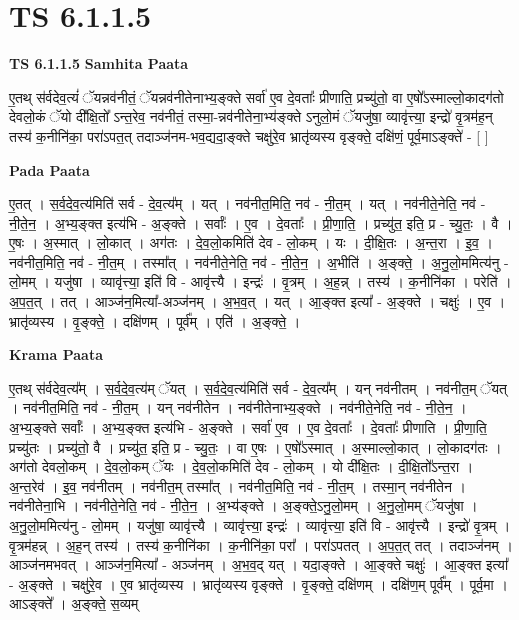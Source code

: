 \documentclass[17pt]{extarticle}
\begin{document}
\section{ TS 6.1.1.5 }

\textbf{TS 6.1.1.5 } \newline
\textbf{Samhita Paata} \newline

ए॒तथ् स॑र्वदेव॒त्यं॑ ॅयन्नव॑नीतं॒ ॅयन्नव॑नीतेनाभ्य॒ङ्क्ते सर्वा॑ ए॒व दे॒वताः᳚ प्रीणाति॒ प्रच्यु॑तो॒ वा ए॒षो᳚ऽस्माल्लो॒कादग॑तो देवलो॒कं ॅयो दी᳚क्षि॒तो᳚ ऽन्त॒रेव॒ नव॑नीतं॒ तस्मा॒-न्नव॑नीतेना॒भ्य॑ङ्क्ते ऽनुलो॒मं ॅयजु॑षा॒ व्यावृ॑त्त्या॒ इन्द्रो॑ वृ॒त्रम॑ह॒न् तस्य॑ क॒नीनि॑का॒ परा॑ऽपत॒त् तदाञ्ज॑नम-भव॒द्यदा॒ङ्क्ते चक्षु॑रे॒व भ्रातृ॑व्यस्य वृङ्क्ते॒ दक्षि॑णं॒ पूर्व॒माऽङ्क्ते॑ - [  ] \newline

\textbf{Pada Paata} \newline

ए॒तत् । स॒र्व॒दे॒व॒त्य॑मिति॑ सर्व - दे॒व॒त्य᳚म् । यत् । नव॑नीत॒मिति॒ नव॑ - नी॒त॒म् । यत् । नव॑नीते॒नेति॒ नव॑ - नी॒ते॒न॒ । अ॒भ्य॒ङ्क्त इत्य॑भि - अ॒ङ्क्ते । सर्वाः᳚ । ए॒व । दे॒वताः᳚ । प्री॒णा॒ति॒ । प्रच्यु॑त॒ इति॒ प्र - च्यु॒तः॒ । वै । ए॒षः । अ॒स्मात् । लो॒कात् । अग॑तः । दे॒व॒लो॒कमिति॑ देव - लो॒कम् । यः । दी॒क्षि॒तः । अ॒न्त॒रा । इ॒व॒ । नव॑नीत॒मिति॒ नव॑ - नी॒त॒म् । तस्मा᳚त् । नव॑नीते॒नेति॒ नव॑ - नी॒ते॒न॒ । अ॒भीति॑ । अ॒ङ्क्ते॒ । अ॒नु॒लो॒ममित्य॑नु - लो॒मम् । यजु॑षा । व्यावृ॑त्त्या॒ इति॑ वि - आवृ॑त्त्यै । इन्द्रः॑ । वृ॒त्रम् । अ॒ह॒न्न् । तस्य॑ । क॒नीनि॑का । परेति॑ । अ॒प॒त॒त् । तत् । आञ्ज॑न॒मित्या᳚-अञ्ज॑नम् । अ॒भ॒व॒त् । यत् । आ॒ङ्क्त इत्या᳚ - अ॒ङ्क्ते । चक्षुः॑ । ए॒व । भ्रातृ॑व्यस्य । वृ॒ङ्क्ते॒ । दक्षि॑णम् । पूर्व᳚म् । एति॑ । अ॒ङ्क्ते॒ ।  \newline


\textbf{Krama Paata} \newline

ए॒तथ् स॑र्वदेव॒त्य᳚म् । स॒र्व॒दे॒व॒त्य॑म् ॅयत् । स॒र्व॒दे॒व॒त्य॑मिति॑ सर्व - दे॒व॒त्य᳚म् । यन् नव॑नीतम् । नव॑नीत॒म् ॅयत् । नव॑नीत॒मिति॒ नव॑ - नी॒त॒म् । यन् नव॑नीतेन । नव॑नीतेनाभ्य॒ङ्‍क्ते । नव॑नीते॒नेति॒ नव॑ - नी॒ते॒न॒ । अ॒भ्य॒ङ्‍क्ते सर्वाः᳚ । अ॒भ्य॒ङ्‍क्त इत्य॑भि - अ॒ङ्‍क्ते । सर्वा॑ ए॒व । ए॒व दे॒वताः᳚ । दे॒वताः᳚ प्रीणाति । प्री॒णा॒ति॒ प्रच्यु॑तः । प्रच्यु॑तो॒ वै । प्रच्यु॑त॒ इति॒ प्र - च्यु॒तः॒ । वा ए॒षः । ए॒षो᳚ऽस्मात् । अ॒स्माल्लो॒कात् । लो॒कादग॑तः । अग॑तो देवलो॒कम् । दे॒व॒लो॒कम् ॅयः । दे॒व॒लो॒कमिति॑ देव - लो॒कम् । यो दी᳚क्षि॒तः । दी॒क्षि॒तो᳚ऽन्त॒रा । अ॒न्त॒रेव॑ । इ॒व॒ नव॑नीतम् । नव॑नीत॒म् तस्मा᳚त् । नव॑नीत॒मिति॒ नव॑ - नी॒त॒म् । तस्मा॒न् नव॑नीतेन । नव॑नीतेना॒भि । नव॑नीते॒नेति॒ नव॑ - नी॒ते॒न॒ । अ॒भ्य॑ङ्‍क्ते । अ॒ङ्‍क्ते॒ऽनु॒लो॒मम् । अ॒नु॒लो॒मम् ॅयजु॑षा । अ॒नु॒लो॒ममित्य॑नु - लो॒मम् । यजु॑षा॒ व्यावृ॑त्त्यै । व्यावृ॑त्त्या॒ इन्द्रः॑ । व्यावृ॑त्त्या॒ इति॑ वि - आवृ॑त्त्यै । इन्द्रो॑ वृ॒त्रम् । वृ॒त्रम॑हन्न् । अ॒ह॒न् तस्य॑ । तस्य॑ क॒नीनि॑का । क॒नीनि॑का॒ परा᳚ । परा॑ऽपतत् । अ॒प॒त॒त् तत् । तदाञ्ज॑नम् । आञ्ज॑नमभवत् । आञ्ज॑न॒मित्या᳚ - अञ्ज॑नम् । अ॒भ॒व॒द् यत् । यदा॒ङ्‍क्ते । आ॒ङ्‍क्ते चक्षुः॑ । आ॒ङ्‍क्त इत्या᳚ - अ॒ङ्‍क्ते । चक्षु॑रे॒व । ए॒व भ्रातृ॑व्यस्य । भ्रातृ॑व्यस्य वृङ्‍क्ते । वृ॒ङ्‍क्ते॒ दक्षि॑णम् । दक्षि॑ण॒म् पूर्व᳚म् । पूर्व॒मा । आऽङ्‍क्ते᳚ । अ॒ङ्‍क्ते॒ स॒व्यम् \newline
\end{document}
